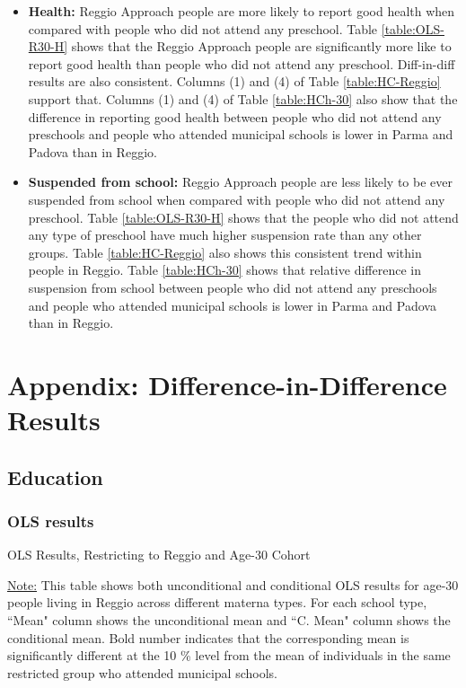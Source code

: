 \documentclass[11pt]{article}
\begin{document}
\begin{itemize}
\item \textbf{Health:} Reggio Approach people are more likely to report good health when compared with people who did not attend any preschool. Table \ref{table:OLS-R30-H} shows that the Reggio Approach people are significantly more like to report good health than people who did not attend any preschool. Diff-in-diff results are also consistent. Columns (1) and (4) of Table \ref{table:HC-Reggio} support that. Columns (1) and (4) of Table \ref{table:HCh-30} also show that the difference in reporting good health between people who did not attend any preschools and people who attended municipal schools is lower in Parma and Padova than in Reggio. 

\item \textbf{Suspended from school:} Reggio Approach people are less likely to be ever suspended from school when compared with people who did not attend any preschool. Table \ref{table:OLS-R30-H} shows that the people who did not attend any type of preschool have much higher suspension rate than any other groups. Table \ref{table:HC-Reggio} also shows this consistent trend within people in Reggio. Table \ref{table:HCh-30} shows that relative difference in suspension from school between people who did not attend any preschools and people who attended municipal schools is lower in Parma and Padova than in Reggio. 
\end{itemize}

\appendix

\section{Appendix: Difference-in-Difference Results}
\subsection{Education}

\subsubsection{OLS results}
\begin{table}[H]
\begin{center}
	\caption{OLS Results, Restricting to Reggio and Age-30 Cohort} \label{table:OLS-R30-E}
	\scalebox{0.75}{
		
	}
	\end{center}
\footnotesize
\underline{Note:} This table shows both unconditional and conditional OLS results for age-30 people living in Reggio across different materna types. For each school type, ``Mean" column shows the unconditional mean and ``C. Mean" column shows the conditional mean. Bold number indicates that the corresponding mean is significantly different at the 10 \% level from the mean of individuals in the same restricted group who attended municipal schools.

\end{table}
\end{document}
